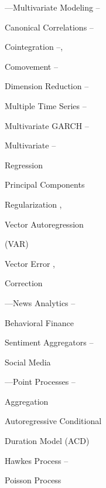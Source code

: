 \begin{multicols}{2}
\noindent ---Multivariate Modeling \hfill \pageref{in:multimod1}--\pageref{in:multimod2} \par
\twoindent Canonical Correlations \hfill \pageref{in:cancor1}--\pageref{in:cancor2} \par
\twoindent Cointegration \hfill \pageref{in:coint1}--\pageref{in:coint2}, \pageref{in:coint3} \par
\twoindent Comovement \hfill \pageref{in:comove1}--\pageref{in:comove2} \par
\twoindent Dimension Reduction \hfill \pageref{in:dimred1}--\pageref{in:dimred2} \par
\twoindent Multiple Time Series \hfill \pageref{in:mts1}--\pageref{in:mts2} \par
\twoindent Multivariate GARCH \hfill \pageref{in:multgarch1}--\pageref{in:multgarch2} \par
\twoindent Multivariate \hfill \pageref{in:multreg1}--\pageref{in:multreg2} \par \hspace{0.75cm} Regression \par 
\twoindent Principal Components \hfill \pageref{in:pca} \par
\twoindent Regularization \hfill \pageref{in:regz1}, \pageref{in:regz2} \par
\twoindent Vector Autoregression \hfill \pageref{in:var} \par \hspace{0.75cm} (VAR) \par 
\twoindent Vector Error \hfill \pageref{in:vec1}, \pageref{in:vec2} \par \hspace{0.75cm} Correction \par 
\vspace{\baselineskip}


\noindent ---News Analytics \hfill \pageref{in:newsan1}--\pageref{in:newsan2} \par
\twoindent Behavioral Finance \hfill \pageref{in:behave1} \par
\twoindent Sentiment Aggregators \hfill \pageref{in:sentag1}--\pageref{in:sentag2} \par
\twoindent Social Media \hfill \pageref{in:social} \par
\vspace{\baselineskip}


\noindent ---Point Processes \hfill \pageref{in:point1}--\pageref{in:point2} \par
\twoindent Aggregation \hfill \pageref{in:agg} \par
\twoindent Autoregressive Conditional \hfill \pageref{in:acd} \par \hspace{0.75cm} Duration Model (ACD) \par 
\twoindent Hawkes Process \hfill \pageref{in:hawk1}--\pageref{in:hawk2} \par
\twoindent Poisson Process \hfill \pageref{in:poisson} \par
\vspace{\baselineskip}



\end{multicols}

